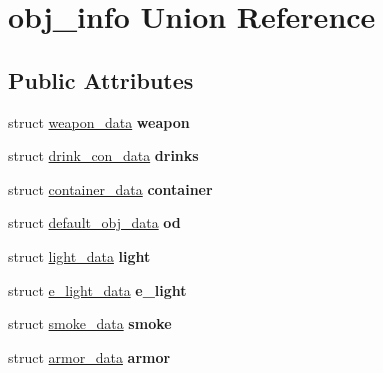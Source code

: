 \hypertarget{unionobj__info}{\section{obj\-\_\-info Union Reference}
\label{unionobj__info}
}
\subsection*{Public Attributes}
\begin{DoxyCompactItemize}
\item 
\hypertarget{unionobj__info_a329dd76db6d64e6f464da0a50e4e2e64}{struct \hyperlink{structweapon__data}{weapon\-\_\-data} {\bfseries weapon}}\label{unionobj__info_a329dd76db6d64e6f464da0a50e4e2e64}

\item 
\hypertarget{unionobj__info_ab9dc892b3698f9c8d58e580d9169bebb}{struct \hyperlink{structdrink__con__data}{drink\-\_\-con\-\_\-data} {\bfseries drinks}}\label{unionobj__info_ab9dc892b3698f9c8d58e580d9169bebb}

\item 
\hypertarget{unionobj__info_a9a6d0a0e2aeb4aa82fab9aeee341d0da}{struct \hyperlink{structcontainer__data}{container\-\_\-data} {\bfseries container}}\label{unionobj__info_a9a6d0a0e2aeb4aa82fab9aeee341d0da}

\item 
\hypertarget{unionobj__info_a560bf8ec14547a42958e5e788d691660}{struct \hyperlink{structdefault__obj__data}{default\-\_\-obj\-\_\-data} {\bfseries od}}\label{unionobj__info_a560bf8ec14547a42958e5e788d691660}

\item 
\hypertarget{unionobj__info_ad91b396eb5177b944eee479853d40160}{struct \hyperlink{structlight__data}{light\-\_\-data} {\bfseries light}}\label{unionobj__info_ad91b396eb5177b944eee479853d40160}

\item 
\hypertarget{unionobj__info_a1663a28a9ef4f0c9f82be5be72fa39a7}{struct \hyperlink{structe__light__data}{e\-\_\-light\-\_\-data} {\bfseries e\-\_\-light}}\label{unionobj__info_a1663a28a9ef4f0c9f82be5be72fa39a7}

\item 
\hypertarget{unionobj__info_a97502f5e0508c9a90b5a98a572e8d315}{struct \hyperlink{structsmoke__data}{smoke\-\_\-data} {\bfseries smoke}}\label{unionobj__info_a97502f5e0508c9a90b5a98a572e8d315}

\item 
\hypertarget{unionobj__info_a552fc4f7734bc659341b5fd857a4aa11}{struct \hyperlink{structarmor__data}{armor\-\_\-data} {\bfseries armor}}\label{unionobj__info_a552fc4f7734bc659341b5fd857a4aa11}


\end{DoxyCompactItemize}
